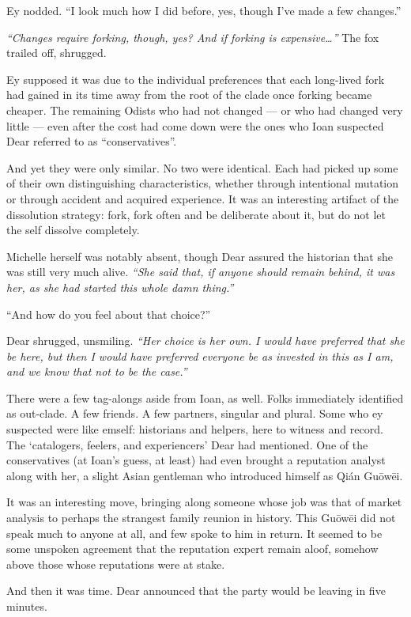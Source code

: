 Ey nodded. ``I look much how I did before, yes, though I've made a few changes.''

\emph{``Changes require forking, though, yes? And if forking is expensive\ldots{}''} The fox trailed off, shrugged.

Ey supposed it was due to the individual preferences that each long-lived fork had gained in its time away from the root of the clade once forking became cheaper. The remaining Odists who had not changed — or who had changed very little — even after the cost had come down were the ones who Ioan suspected Dear referred to as ``conservatives''.

And yet they were only similar. No two were identical. Each had picked up some of their own distinguishing characteristics, whether through intentional mutation or through accident and acquired experience. It was an interesting artifact of the dissolution strategy: fork, fork often and be deliberate about it, but do not let the self dissolve completely.

Michelle herself was notably absent, though Dear assured the historian that she was still very much alive. \emph{``She said that, if anyone should remain behind, it was her, as she had started this whole damn thing.''}

``And how do you feel about that choice?''

Dear shrugged, unsmiling. \emph{``Her choice is her own. I would have preferred that she be here, but then I would have preferred everyone be as invested in this as I am, and we know that not to be the case.''}

There were a few tag-alongs aside from Ioan, as well. Folks immediately identified as out-clade. A few friends. A few partners, singular and plural. Some who ey suspected were like emself: historians and helpers, here to witness and record. The `catalogers, feelers, and experiencers' Dear had mentioned. One of the conservatives (at Ioan's guess, at least) had even brought a reputation analyst along with her, a slight Asian gentleman who introduced himself as Qián Guōwēi.

It was an interesting move, bringing along someone whose job was that of market analysis to perhaps the strangest family reunion in history. This Guōwēi did not speak much to anyone at all, and few spoke to him in return. It seemed to be some unspoken agreement that the reputation expert remain aloof, somehow above those whose reputations were at stake.

And then it was time. Dear announced that the party would be leaving in five minutes.
